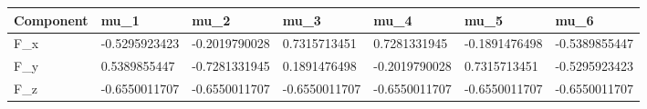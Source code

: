 \begin{tabular}{@{}lllllll@{}}
\toprule
Component & mu\_1 & mu\_2 & mu\_3 & mu\_4 & mu\_5 & mu\_6 \\
\midrule
F\_x & -0.5295923423 & -0.2019790028 & 0.7315713451 & 0.7281331945 & -0.1891476498 & -0.5389855447 \\
F\_y & 0.5389855447 & -0.7281331945 & 0.1891476498 & -0.2019790028 & 0.7315713451 & -0.5295923423 \\
F\_z & -0.6550011707 & -0.6550011707 & -0.6550011707 & -0.6550011707 & -0.6550011707 & -0.6550011707 \\
\bottomrule
\end{tabular}

